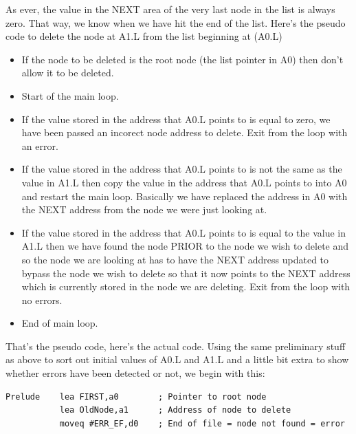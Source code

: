 As ever, the value in the NEXT area of the very last node in the
      list is always zero. That way, we know when we have hit the end of the
      list. Here's the pseudo code to delete the node at A1.L from the list
      beginning at (A0.L)
\begin{itemize}[itemsep=0pt]

\item{}If the node to be deleted is the root node (the list pointer
          in A0) then don't allow it to be deleted.


\item{}Start of the main loop.


\item{}If the value stored in the address that A0.L points to is
          equal to zero, we have been passed an incorect node address to
          delete. Exit from the loop with an error.


\item{}If the value stored in the address that A0.L points to is not
          the same as the value in A1.L then copy the value in the address
          that A0.L points to into A0 and restart the main loop. Basically we
          have replaced the address in A0 with the NEXT address from the node
          we were just looking at.


\item{}If the value stored in the address that A0.L points to is
          equal to the value in A1.L then we have found the node PRIOR to the
          node we wish to delete and so the node we are looking at has to have
          the NEXT address updated to bypass the node we wish to delete so
          that it now points to the NEXT address which is currently stored in
          the node we are deleting. Exit from the loop with no errors.


\item{}End of main loop.

\end{itemize}

That's the pseudo code, here's the actual code. Using the same
      preliminary stuff as above to sort out initial values of A0.L and A1.L
      and a little bit extra to show whether errors have been detected or not,
      we begin with this:

\begin{lstlisting}[firstnumber=1,caption={Deleting a Node - Prelude},label={lst:DeletingANodePrelude}]
Prelude    lea FIRST,a0        ; Pointer to root node
           lea OldNode,a1      ; Address of node to delete
           moveq #ERR_EF,d0    ; End of file = node not found = error
\end{lstlisting}

